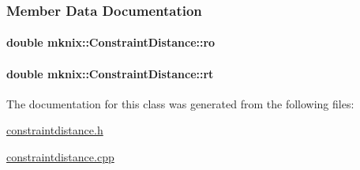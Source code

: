 \subsubsection{Member Data Documentation}
\hypertarget{classmknix_1_1_constraint_distance_a2d4a4e3c3b75b23f63a772b71c4badaa}{
\paragraph[{ro}]{\setlength{\rightskip}{0pt plus 5cm}double mknix\-::\-Constraint\-Distance\-::ro\hspace{0.3cm}{\ttfamily [protected]}}}\label{classmknix_1_1_constraint_distance_a2d4a4e3c3b75b23f63a772b71c4badaa}
\hypertarget{classmknix_1_1_constraint_distance_ae4054619a2e3205079c4911ad69db4eb}{
\paragraph[{rt}]{\setlength{\rightskip}{0pt plus 5cm}double mknix\-::\-Constraint\-Distance\-::rt\hspace{0.3cm}{\ttfamily [protected]}}}\label{classmknix_1_1_constraint_distance_ae4054619a2e3205079c4911ad69db4eb}


The documentation for this class was generated from the following files\-:\begin{DoxyCompactItemize}
\item 
\hyperlink{constraintdistance_8h}{constraintdistance.\-h}\item 
\hyperlink{constraintdistance_8cpp}{constraintdistance.\-cpp}\end{DoxyCompactItemize}

